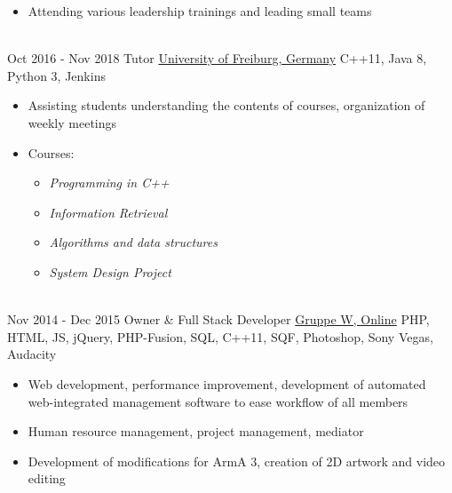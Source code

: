 \documentclass[letterpaper]{twentysecondcv} %
\begin{document}
\begin{twenty}
{\begin{itemize}
        			\item Attending various leadership trainings and leading small teams
        		\end{itemize}}\\
     	\twentyitem
    		{Oct 2016 -}
		{Nov 2018}
        		{Tutor}
        		{\href{https://www.uni-freiburg.de/}{University of Freiburg, Germany}}
        		{C++11, Java 8, Python 3, Jenkins}
        		{\begin{itemize}
        			\item Assisting students understanding the contents of courses, organization of weekly meetings
        			\item Courses:
        			\begin{itemize}
        				\item \textit{Programming in C++}
        				\item \textit{Information Retrieval}
        				\item \textit{Algorithms and data structures}
        				\item \textit{System Design Project}
        			\end{itemize}
        		\end{itemize}}\\
	\twentyitem
    		{Nov 2014 -}
		{Dec 2015}
        		{Owner \& Full Stack Developer}
        		{\href{https://www.gruppe-w.de/}{Gruppe W, Online}}
        		{PHP, HTML, JS, jQuery, PHP-Fusion, SQL, C++11, SQF, Photoshop, Sony Vegas, Audacity}
        		{\begin{itemize}
        			\item Web development, performance improvement, development of automated web-integrated
        				management software to ease workflow of all members
			\item Human resource management, project management, mediator
        			\item Development of modifications for ArmA 3, creation of 2D artwork and video editing
        		\end{itemize}}
\end{twenty}

\newpage

\makesidebarSecond %

\end{document}
